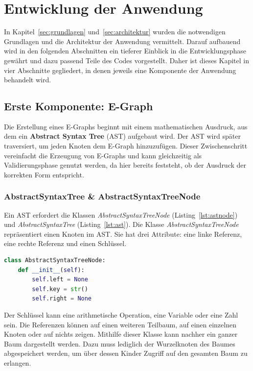 \section{Entwicklung der Anwendung}\label{sec:entwicklung}

In Kapitel~\ref{sec:grundlagen} und~\ref{sec:architektur} wurden die notwendigen Grundlagen und die Architektur der Anwendung vermittelt.
Darauf aufbauend wird in den folgenden Abschnitten ein tieferer Einblick in die Entwicklungsphase gewährt und dazu passend Teile des Codes vorgestellt.
Daher ist dieses Kapitel in vier Abschnitte gegliedert, in denen jeweils eine Komponente der Anwendung behandelt wird.

\subsection{Erste Komponente: E-Graph}

Die Erstellung eines E-Graphs beginnt mit einem mathematischen Ausdruck, aus dem ein \textbf{Abstract Syntax Tree} (AST) aufgebaut wird.
Der AST wird später traversiert, um jeden Knoten dem E-Graph hinzuzufügen. Dieser Zwischenschritt vereinfacht die Erzeugung von E-Graphs und
kann gleichzeitig als Validierungsphase genutzt werden, da hier bereits feststeht, ob der Ausdruck der korrekten Form entspricht.

\subsubsection{AbstractSyntaxTree \& AbstractSyntaxTreeNode}

Ein AST erfordert die Klassen \textit{AbstractSyntaxTreeNode} (Listing~\ref{lst:astnode}) und 
\textit{AbstractSyntaxTree} (Listing~\ref{lst:ast}). Die Klasse \textit{AbstractSyntaxTreeNode} repräsentiert
einen Knoten im AST. Sie hat drei Attribute: eine linke Referenz, eine rechte Referenz und einen Schlüssel.

\begin{lstlisting}[language=Python, caption=Klasse \textit{AbstractSyntaxTreeNode}, label={lst:astnode}]
class AbstractSyntaxTreeNode:
    def __init__(self):
        self.left = None
        self.key = str()
        self.right = None
\end{lstlisting}

Der Schlüssel kann eine arithmetische Operation, eine Variable oder eine Zahl sein. Die Referenzen können auf einen weiteren Teilbaum, auf einen einzelnen Knoten
oder auf nichts zeigen. Mithilfe dieser Klasse kann nachher ein ganzer Baum dargestellt werden. Dazu muss lediglich der Wurzelknoten des Baumes abgespeichert werden, um über dessen Kinder
Zugriff auf den gesamten Baum zu erlangen. 

